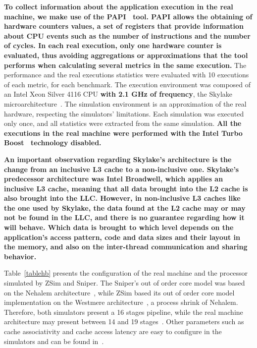 \documentclass[AMA,final,STIX1COL]{WileyNJD-v2}
\newcommand\new[1]{{\color{red}\textbf{#1}}}
\begin{document}
\new{To collect information about the application execution in the real machine, we make use of the PAPI~\cite{terpstra2010papi} tool.
PAPI allows the obtaining of hardware counters values, a set of registers that provide information about CPU events such as the number of instructions and the number of cycles.
In each real execution, only one hardware counter is evaluated, thus avoiding aggregations or approximations that the tool performs when calculating several metrics in the same execution.}
The performance and the real executions statistics were evaluated with 10 executions of each metric, for each benchmark.
The execution environment was composed of an Intel Xeon Silver 4116 CPU \textbf{with 2.1 GHz of frequency}, the Skylake microarchitecture~\cite{doweck2017skylake}.
The simulation environment is an approximation of the real hardware, respecting the simulators' limitations.
Each simulation was executed only once, and all statistics were extracted from the same simulation.
\textbf{All the executions in the real machine were performed with the Intel Turbo Boost~\cite{rotem2012turbo} technology disabled.}

\textbf{An important observation regarding Skylake's architecture is the change from an inclusive L3 cache to a non-inclusive one.
Skylake's predecessor architecture was Intel Broadwell, which applies an inclusive L3 cache, meaning that all data brought into the L2 cache is also brought into the LLC.
However, in non-inclusive L3 caches like the one used by Skylake, the data found at the L2 cache may or may not be found in the LLC, and there is no guarantee regarding how it will behave.
Which data is brought to which level depends on the application's access pattern, code and data sizes and their layout in the memory, and also on the inter-thread communication and sharing behavior.
}

Table~\ref{tablehb}  presents the configuration of the real machine and the processor simulated by ZSim and Sniper. 
The Sniper's out of order core model was based on the Nehalem architecture~\cite{carlson2011sniper}, while ZSim based its out of order core model implementation on the Westmere architecture~\cite{sanchez2013zsim}, a process shrink of Nehalem.
Therefore, both simulators present a 16 stages pipeline, while the real machine architecture may present between 14 and 19 stages~\cite{fog2012microarchitecture}.
Other parameters such as cache associativity and cache access latency are easy to configure in the simulators and can be found in~\cite{fog2012microarchitecture,doweck2017skylake}.
\end{document}
